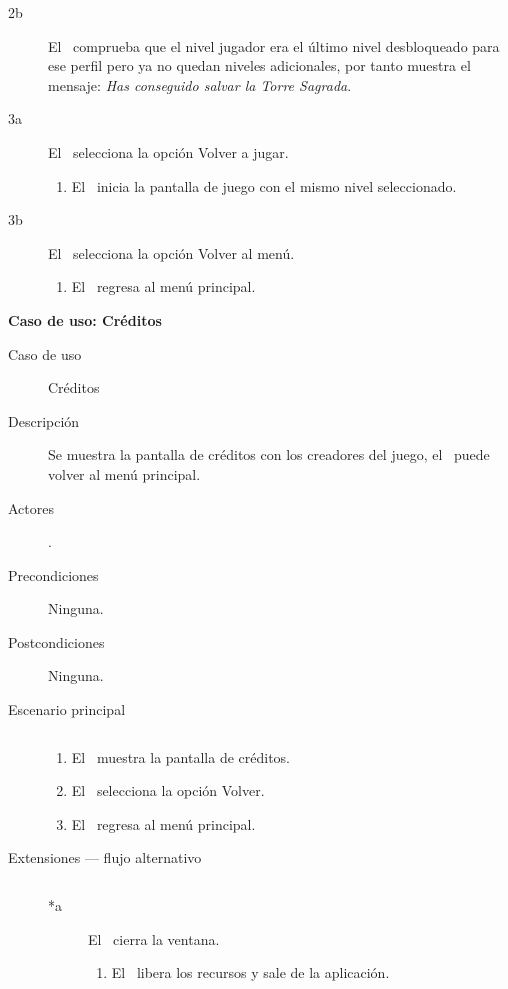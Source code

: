 \begin{description}
\begin{description}
            \item [2b] El \sistema\ comprueba que el nivel jugador era el
            último nivel desbloqueado para ese perfil pero ya no quedan
            niveles adicionales, por tanto muestra el mensaje: \emph{Has
            conseguido salvar la Torre Sagrada}.
            \item [3a] El \jugador\ selecciona la opción Volver a jugar.
                \begin{enumerate}
                    \item El \sistema\ inicia la pantalla de juego con
                    el mismo nivel seleccionado.
                \end{enumerate}
            \item [3b] El \jugador\ selecciona la opción Volver al menú.
                \begin{enumerate}
                    \item El \sistema\ regresa al menú principal.\\
                \end{enumerate}
        \end{description}
    
\end{description}


\textbf{Caso de uso: Créditos}

\begin{description}
    \item [Caso de uso] Créditos
    \item [Descripción] Se muestra la pantalla de créditos con los creadores
    del juego, el \jugador\ puede volver al menú principal.
    \item [Actores] \jugador.
    \item [Precondiciones] Ninguna.
    \item [Postcondiciones] Ninguna.
    \item [Escenario principal] $\quad$
        \begin{enumerate}
            \item El \sistema\ muestra la pantalla de créditos.
            \item El \jugador\ selecciona la opción Volver.
            \item El \sistema\ regresa al menú principal.
        \end{enumerate}
    \item[Extensiones --- flujo alternativo] $\quad$
        \begin{description}
            \item [*a] El \jugador\ cierra la ventana.
                \begin{enumerate}
                    \item El \sistema\ libera los recursos y sale de la aplicación.\\
                \end{enumerate}
        \end{description}
    
\end{description}

